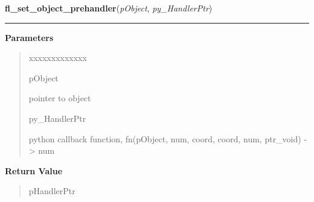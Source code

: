 \hspace{.8\funcindent}\begin{boxedminipage}{\funcwidth}

    \raggedright \textbf{fl\_set\_object\_prehandler}(\textit{pObject}, \textit{py\_HandlerPtr})

    \vspace{-1.5ex}

    \rule{\textwidth}{0.5\fboxrule}
\setlength{\parskip}{2ex}
\setlength{\parskip}{1ex}
      \textbf{Parameters}
      \vspace{-1ex}

      \begin{quote}
        \begin{Ventry}{xxxxxxxxxxxxx}

          \item[pObject]

          pointer to object

          \item[py\_HandlerPtr]

          python callback function, fn(pObject, num, coord, coord, num, 
          ptr\_void) -{\textgreater} num

        \end{Ventry}

      \end{quote}

      \textbf{Return Value}
    \vspace{-1ex}

      \begin{quote}
      pHandlerPtr

      \end{quote}

    \end{boxedminipage}

    \label{xformslib:library:fl_set_object_posthandler}

    \vspace{0.5ex}

